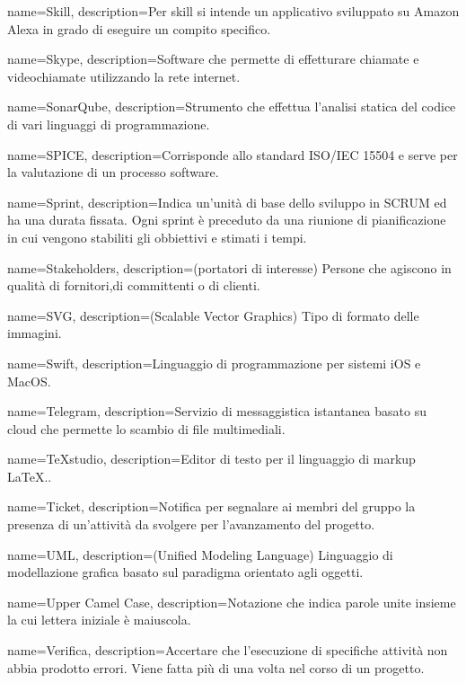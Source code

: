 {
name={Skill},
description={Per skill si intende un applicativo sviluppato su Amazon Alexa in grado di eseguire un compito specifico.}
}

{
name={Skype},
description={Software che permette di effetturare chiamate e videochiamate utilizzando la rete internet.}
}

{
name={SonarQube},
description={Strumento che effettua l’analisi statica del codice di vari linguaggi di programmazione.}
}

{
name={SPICE},
description={Corrisponde allo standard ISO/IEC 15504 e serve per la valutazione di un processo software.}
}

{
name={Sprint},
description={Indica un’unità di base dello sviluppo in SCRUM ed ha una durata fissata. Ogni sprint è preceduto da una riunione di pianificazione in cui vengono stabiliti gli obbiettivi e stimati i tempi.}
}

{
name={Stakeholders},
description={(portatori di interesse) Persone che agiscono in qualità di fornitori,di committenti o di clienti.}
}

{
name={SVG},
description={(Scalable Vector Graphics) Tipo di formato delle immagini.}
}

{
name={Swift},
description={Linguaggio di programmazione per sistemi iOS e MacOS.}
}

{
name={Telegram},
description={Servizio di messaggistica istantanea basato su cloud che permette lo scambio di file multimediali.}
}

{
name={TeXstudio},
description={Editor di testo per il linguaggio di markup \LaTeX..}
}

{
name={Ticket},
description={Notifica per segnalare ai membri del gruppo la presenza di un’attività da svolgere per l’avanzamento del progetto.}
}

{
name={UML},
description={(Unified Modeling Language) Linguaggio di modellazione grafica basato sul paradigma orientato agli oggetti.}
}

{
name={Upper Camel Case},
description={Notazione che indica parole unite insieme la cui lettera iniziale è maiuscola.}
}

{
name={Verifica},
description={Accertare che l’esecuzione di specifiche attività non abbia prodotto errori. Viene fatta più di una volta nel corso di un progetto.}
}

